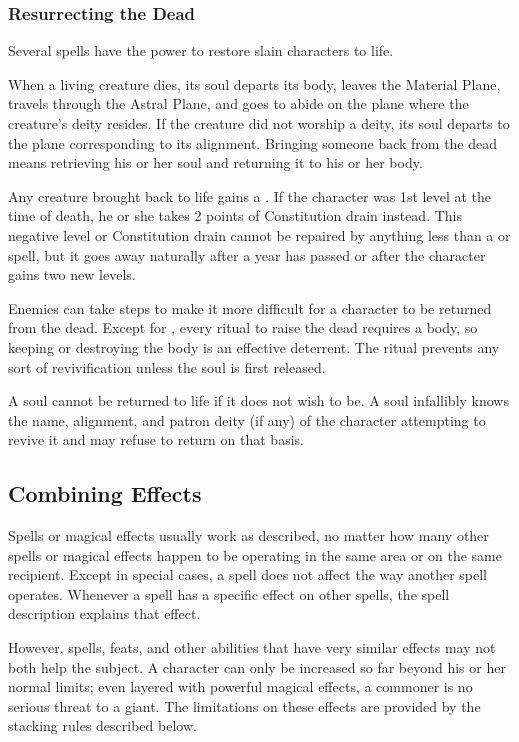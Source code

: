 \subsubsection{Resurrecting the Dead}\label{Resurrecting the Dead}

Several spells have the power to restore slain characters to life.

When a living creature dies, its soul departs its body, leaves the Material Plane, travels through the Astral Plane, and goes to abide on the plane where the creature's deity resides. If the creature did not worship a deity, its soul departs to the plane corresponding to its alignment. Bringing someone back from the dead means retrieving his or her soul and returning it to his or her body.

 Any creature brought back to life gains a \negativelevel. If the character was 1st level at the time of death, he or she takes 2 points of Constitution drain instead. This negative level or Constitution drain cannot be repaired by anything less than a  or  spell, but it goes away naturally after a year has passed or after the character gains two new levels.

 Enemies can take steps to make it more difficult for a character to be returned from the dead. Except for , every ritual to raise the dead requires a body, so keeping or destroying the body is an effective deterrent. The  ritual prevents any sort of revivification unless the soul is first released.

 A soul cannot be returned to life if it does not wish to be. A soul infallibly knows the name, alignment, and patron deity (if any) of the character attempting to revive it and may refuse to return on that basis.


\subsection{Combining Effects}
Spells or magical effects usually work as described, no matter how many other spells or magical effects happen to be operating in the same area or on the same recipient. Except in special cases, a spell does not affect the way another spell operates. Whenever a spell has a specific effect on other spells, the spell description explains that effect.

However, spells, feats, and other abilities that have very similar effects may not both help the subject. A character can only be increased so far beyond his or her normal limits; even layered with powerful magical effects, a commoner is no serious threat to a giant. The limitations on these effects are provided by the stacking rules described below.

